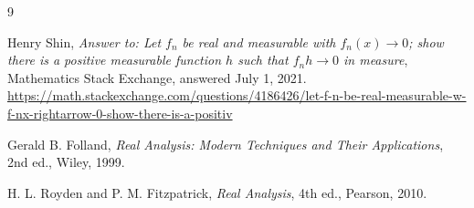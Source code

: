 \documentclass[11pt]{article}
\theoremstyle{plain}
\theoremstyle{definition}
\theoremstyle{remark}
\begin{document}
\begin{thebibliography}{9}

Henry Shin,
\emph{Answer to: Let $f_n$ be real and measurable with $f_n(x)\to 0$; show
there is a positive measurable function $h$ such that $f_nh\to 0$ in measure},
Mathematics Stack Exchange, answered July 1, 2021.
\url{https://math.stackexchange.com/questions/4186426/let-f-n-be-real-measurable-w-f-nx-rightarrow-0-show-there-is-a-positiv}

Gerald B. Folland,
\emph{Real Analysis: Modern Techniques and Their Applications},
2nd ed., Wiley, 1999.

H. L. Royden and P. M. Fitzpatrick,
\emph{Real Analysis},
4th ed., Pearson, 2010.

\end{thebibliography}
\end{document}
